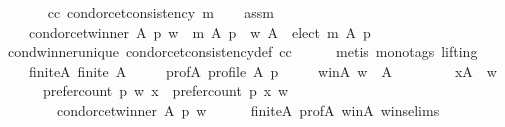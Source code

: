 \begin{isabellebody}
\ \ \isamarkupfalse%
\isanewline
\ \ \ \ cc{\isacharcolon}{\kern0pt}\ {\isachardoublequoteopen}condorcet{\isacharunderscore}{\kern0pt}consistency\ m{\isachardoublequoteclose}\isanewline
\ \ \isamarkupfalse%
\ assm{}{\isacharcolon}{\kern0pt}\isanewline
\ \ \ \ {\isachardoublequoteopen}condorcet{\isacharunderscore}{\kern0pt}winner\ A\ p\ w\ {\isasymLongrightarrow}\ m\ A\ p\ {\isacharequal}{\kern0pt}\ {\isacharparenleft}{\kern0pt}{\isacharbraceleft}{\kern0pt}w{\isacharbraceright}{\kern0pt}{\isacharcomma}{\kern0pt}\ A\ {\isacharminus}{\kern0pt}\ elect\ m\ A\ p{\isacharcomma}{\kern0pt}\ {\isacharbraceleft}{\kern0pt}{\isacharbraceright}{\kern0pt}{\isacharparenright}{\kern0pt}{\isachardoublequoteclose}\isanewline
\ \ \ \ \isamarkupfalse%
\ cond{\isacharunderscore}{\kern0pt}winner{\isacharunderscore}{\kern0pt}unique{}\ condorcet{\isacharunderscore}{\kern0pt}consistency{\isacharunderscore}{\kern0pt}def\ cc\isanewline
\ \ \ \ \isamarkupfalse%
\ {\isacharparenleft}{\kern0pt}metis\ {\isacharparenleft}{\kern0pt}mono{\isacharunderscore}{\kern0pt}tags{\isacharcomma}{\kern0pt}\ lifting{\isacharparenright}{\kern0pt}{\isacharparenright}{\kern0pt}\isanewline
\ \ \isamarkupfalse%
\isanewline
\ \ \ \ finite{\isacharunderscore}{\kern0pt}A{\isacharcolon}{\kern0pt}\ {\isachardoublequoteopen}finite\ A{\isachardoublequoteclose}\ \isanewline
\ \ \ \ prof{\isacharunderscore}{\kern0pt}A{\isacharcolon}{\kern0pt}\ {\isachardoublequoteopen}profile\ A\ p{\isachardoublequoteclose}\ \isanewline
\ \ \ \ w{\isacharunderscore}{\kern0pt}in{\isacharunderscore}{\kern0pt}A{\isacharcolon}{\kern0pt}\ {\isachardoublequoteopen}w\ {\isasymin}\ A{\isachardoublequoteclose}\isanewline
\ \ \isamarkupfalse%
\ \isamarkupfalse%
\isanewline
\ \ \ \ {\isachardoublequoteopen}{\isasymforall}x{\isasymin}A\ {\isacharminus}{\kern0pt}\ {\isacharbraceleft}{\kern0pt}w{\isacharbraceright}{\kern0pt}{\isachardot}{\kern0pt}\isanewline
\ \ \ \ \ \ prefer{\isacharunderscore}{\kern0pt}count\ p\ w\ x\ {\isachargreater}{\kern0pt}\ prefer{\isacharunderscore}{\kern0pt}count\ p\ x\ w\ {\isasymLongrightarrow}\isanewline
\ \ \ \ \ \ \ \ condorcet{\isacharunderscore}{\kern0pt}winner\ A\ p\ w{\isachardoublequoteclose}\isanewline
\ \ \ \ \isamarkupfalse%
\ finite{\isacharunderscore}{\kern0pt}A\ prof{\isacharunderscore}{\kern0pt}A\ w{\isacharunderscore}{\kern0pt}in{\isacharunderscore}{\kern0pt}A\ wins{\isachardot}{\kern0pt}elims\isanewline
\ \ \ \ \isamarkupfalse%

\end{isabellebody}
